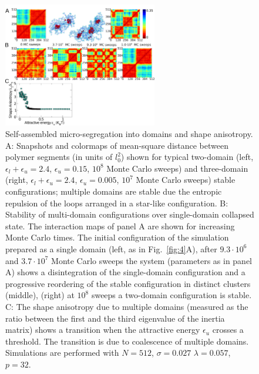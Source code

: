 \documentclass[
preprint,
a4paper,
12pt,
superscriptaddress,
pre]{revtex4}
\begin{document}
\begin{figure}
  \centering
  \includegraphics[width=0.6\textwidth]{fig5}
  \caption{Self-assembled micro-segregation into domains and shape
    anisotropy.  A: Snapshots and colormaps of mean-square distance between
    polymer segments (in units of $l_0^2$)
  shown  for  typical two-domain
  (left, $\epsilon_l+\epsilon_u=2.4$, $\epsilon_u=0.15$, $10^8$  Monte
  Carlo sweeps) and three-domain (right, $\epsilon_l+\epsilon_u=2.4$, 
  $\epsilon_u=0.005$, $10^7$  Monte Carlo sweeps) stable configurations;
    multiple domains are stable due the entropic repulsion of the
    loops arranged in a star-like configuration.   
%
B: Stability of multi-domain configurations over single-domain
collapsed state. The interaction maps of panel A are shown for
increasing Monte Carlo times. 
%
The  initial configuration of the simulation 
prepared as a single domain (left, as in Fig.~\ref{fig:4}A),  after
$9.3\cdot10^6$ and $3.7\cdot10^7$ Monte Carlo sweeps the system
(parameters as in panel A)  shows a
disintegration of the single-domain configuration and a progressive
reordering of the stable configuration in distinct clusters (middle), (right)
at $10^8$ sweeps a two-domain configuration is stable. 
%  
C: The shape anisotropy due to multiple domains (measured as the
ratio between the first and the third eigenvalue of the inertia
matrix)  shows a transition when the attractive energy $\epsilon_u$
crosses a threshold. The transition is due to coalescence of multiple
domains.  
%
Simulations are performed with $N = 512$, $\sigma = 0.027$ 
 $\lambda = 0.057$,  $p=32$.}
  \label{fig:5}
\end{figure}






\end{document}
